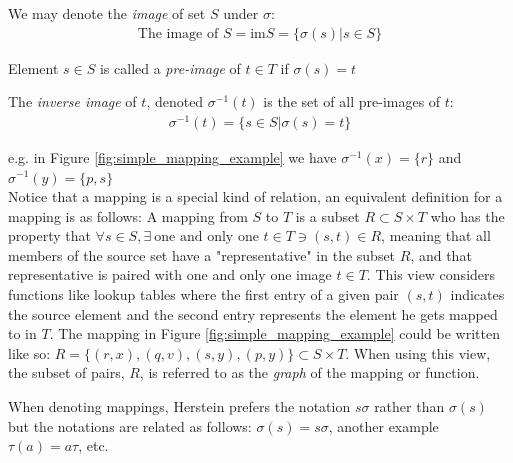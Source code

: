 \begin{definition}
We may denote the \textit{image} of set $S$ under $\sigma$:
\begin{align}
    \text{The image of } S = \text{im} S= \{\sigma(s)|s\in S\}\nonumber
\end{align}
\end{definition} 
\begin{definition}
Element $s\in S$ is called a \textit{pre-image} of $t\in T$ if $\sigma(s)=t$
\end{definition}
\begin{definition}
The \textit{inverse image} of $t$, denoted $\sigma^{-1}(t)$ is the set of all pre-images of $t$:
\begin{align}
    \sigma^{-1}(t)=\{s\in S | \sigma(s)=t \}\nonumber
\end{align}
\end{definition}
e.g. in Figure \ref{fig:simple_mapping_example} we have $\sigma^{-1}(x)=\{r\}$ and $\sigma^{-1}(y)=\{p,s\}$\\
Notice that a mapping is a special kind of relation, an equivalent definition for a mapping is as follows: A mapping from $S$ to $T$ is a subset $R\subset S \times T$ who has the property that $\forall s \in S, \exists \ \text{one and only one } t\in T \ni (s,t)\in R$, meaning that all members of the source set have a "representative" in the subset $R$, and that representative is paired with one and only one image $t\in T$. This view considers functions like lookup tables where the first entry of a given pair $(s,t)$ indicates the source element and the second entry represents the element he gets mapped to in $T$. The mapping in Figure \ref{fig:simple_mapping_example} could be written like so: $R=\{(r,x),(q,v),(s,y),(p,y)\} \subset S\times T$. When using this view, the subset of pairs, $R$, is referred to as the \textit{graph} of the mapping or function. 
\begin{notation}
When denoting mappings, Herstein prefers the notation $s\sigma$ rather than $\sigma(s)$ but the notations are related as follows: $\sigma(s) = s\sigma$, another example $\tau(a)=a\tau$, etc. 
\end{notation}

